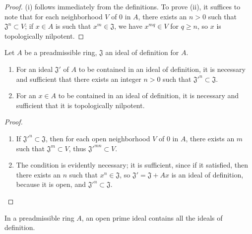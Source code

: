 \begin{proof}
(i) follows immediately from the definitions. To prove (ii), it suffices to note that for
each neighborhood $V$ of $0$ in $A$, there exists an $n>0$ such that
$\mathfrak{J}^n\subset V$; if $x\in A$ is such that $x^m\in\mathfrak{J}$, we have
$x^{mq}\in V$ for $q\geq n$, so $x$ is topologically nilpotent.
\end{proof}

\begin{proposition}[7.1.4]
\label{0.7.1.4}
Let $A$ be a preadmissible ring, $\mathfrak{J}$ an ideal of definition for $A$.
\begin{enumerate}
  \item[{\rm(i)}] For an ideal $\mathfrak{J}'$ of $A$ to be contained in an ideal of
    definition, it is necessary and sufficient that there exists an integer
    $n>0$ such that ${\mathfrak{J}'}^n\subset\mathfrak{J}$.
  \item[{\rm(ii)}] For an $x\in A$ to be contained in an ideal of definition, it is
    necessary and sufficient that it is topologically nilpotent.
\end{enumerate}
\end{proposition}

\begin{proof}
\medskip\noindent
\begin{enumerate}
  \item[(i)] If ${\mathfrak{J}'}^n\subset\mathfrak{J}$, then for each open neighborhood
    $V$ of $0$ in $A$, there exists an $m$ such that $\mathfrak{J}^m\subset V$, thus
    ${\mathfrak{J}'}^{mn}\subset V$.
  \item[(ii)] The condition is evidently necessary; it is sufficient, since if it
    satisfied, then there exists an $n$ such that $x^n\in\mathfrak{J}$, so
    $\mathfrak{J}'=\mathfrak{J}+Ax$ is an ideal of definition, because it is
    open, and ${\mathfrak{J}'}^n\subset\mathfrak{J}$.
\end{enumerate}
\end{proof}

\begin{corollary}[7.1.5]
\label{0.7.1.5}
In a preadmissible ring $A$, an open prime ideal contains all the ideals of definition.
\end{corollary}

